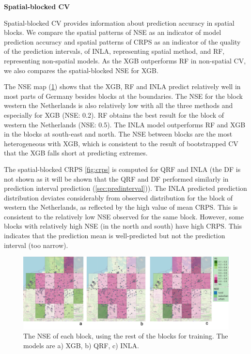 \documentclass{article}
\begin{document}
\noindent \textbf{Spatial-blocked CV}

Spatial-blocked CV provides information about prediction accuracy in spatial blocks. 
We compare the spatial patterns of NSE as an indicator of model prediction accuracy and spatial patterns of CRPS as an indicator of the quality of the prediction intervals, of INLA, representing spatial method, and RF, representing non-spatial models. As the XGB outperforms RF in non-spatial CV, we also compares the spatial-blocked NSE for XGB. 

The NSE map (\cref{fig:r2}) shows that the XGB, RF and INLA predict relatively well in most parts of Germany besides blocks at the boundaries. The NSE for the block western the Netherlands is also relatively low with all the three methods and especially for XGB (NSE: 0.2). RF obtains the best result for the block of western the Netherlands (NSE: 0.5). The INLA model outperforms RF and XGB in the blocks at south-east and north. The NSE between blocks are the most heterogeneous with XGB, which is consistent to the result of bootstrapped CV that the XGB falls short at predicting extremes.  

The spatial-blocked CRPS \cref{fig:crps} is computed for QRF and INLA (the DF is not shown as it will be shown that the QRF and DF performed similarly in prediction interval prediction (\cref{sec:predinterval})). The INLA predicted prediction distribution deviates considerably from observed distribution for the block of western the Netherlands, as reflected by the high value of mean CRPS. This is consistent to the relatively low NSE observed for the same block. However, some blocks with relatively high NSE (in the north and south) have high CRPS. This indicates that the prediction mean is well-predicted but not the prediction interval (too narrow). 

\begin{figure}
    \centering
    \includegraphics[scale=0.4]{fig/r2spcv.png}
    \caption{The NSE of each block, using the rest of the blocks for training. The models are a) XGB, b) QRF, c) INLA. 
}
    \label{fig:r2}
\end{figure}
\end{document}
